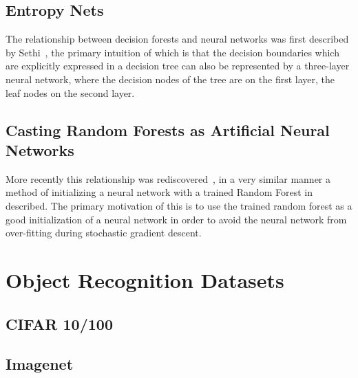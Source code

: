 \documentclass[thesis]{subfiles}
\begin{document}
\subsection{Entropy Nets}
The relationship between decision forests and neural networks was first described by Sethi~\cite{Sethi1990}, the primary intuition of which is that the decision boundaries which are explicitly expressed in a decision tree can also be represented by a three-layer neural network, where the decision nodes of the tree are on the first layer, the leaf nodes on the second layer.

\subsection{Casting Random Forests as Artificial Neural Networks}
More recently this relationship was rediscovered~\cite{Welbl2014casting}, in a very similar manner a method of initializing a neural network with a trained Random Forest in described. The primary motivation of this is to use the trained random forest as a good initialization of a neural network in order to avoid the neural network from over-fitting during stochastic gradient descent.

\section{Object Recognition Datasets}
\subsection{CIFAR 10/100}
\subsection{Imagenet}
\end{document}
